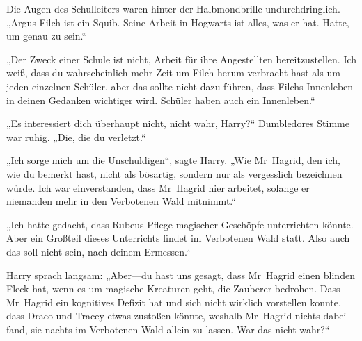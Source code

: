 Die Augen des Schulleiters waren hinter der Halbmondbrille undurchdringlich.
„Argus Filch ist ein Squib. Seine Arbeit in Hogwarts ist alles, was er hat. Hatte, um genau zu sein.“

„Der Zweck einer Schule ist nicht, Arbeit für ihre Angestellten bereitzustellen. Ich weiß, dass du wahrscheinlich mehr Zeit um Filch herum verbracht hast als um jeden einzelnen Schüler, aber das sollte nicht dazu führen, dass Filchs Innenleben in deinen Gedanken wichtiger wird. Schüler haben auch ein Innenleben.“

„Es interessiert dich überhaupt nicht, nicht wahr, Harry?“ Dumbledores Stimme war ruhig.
„Die, die du verletzt.“

„Ich sorge mich um die Unschuldigen“, sagte Harry.
„Wie Mr~Hagrid, den ich, wie du bemerkt hast, nicht als bösartig, sondern nur als vergesslich bezeichnen würde. Ich war einverstanden, dass Mr~Hagrid hier arbeitet, solange er niemanden mehr in den Verbotenen Wald mitnimmt.“

„Ich hatte gedacht, dass Rubeus Pflege magischer Geschöpfe unterrichten könnte. Aber ein Großteil dieses Unterrichts findet im Verbotenen Wald statt. Also auch das soll nicht sein, nach deinem Ermessen.“

Harry sprach langsam:
„Aber—du hast uns gesagt, dass Mr~Hagrid einen blinden Fleck hat, wenn es um magische Kreaturen geht, die Zauberer bedrohen. Dass Mr~Hagrid ein kognitives Defizit hat und sich nicht wirklich vorstellen konnte, dass Draco und Tracey etwas zustoßen könnte, weshalb Mr~Hagrid nichts dabei fand, sie nachts im Verbotenen Wald allein zu lassen. War das nicht wahr?“

